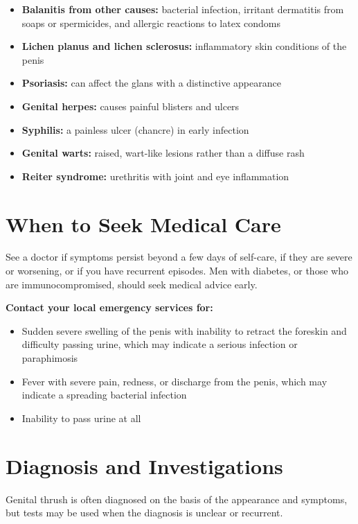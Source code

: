 \begin{itemize}
    \item \textbf{Balanitis from other causes:} bacterial infection, irritant dermatitis from soaps or spermicides, and allergic reactions to latex condoms
    \item \textbf{Lichen planus and lichen sclerosus:} inflammatory skin conditions of the penis
    \item \textbf{Psoriasis:} can affect the glans with a distinctive appearance
    \item \textbf{Genital herpes:} causes painful blisters and ulcers
    \item \textbf{Syphilis:} a painless ulcer (chancre) in early infection
    \item \textbf{Genital warts:} raised, wart-like lesions rather than a diffuse rash
    \item \textbf{Reiter syndrome:} urethritis with joint and eye inflammation
\end{itemize}

\section*{When to Seek Medical Care}
See a doctor if symptoms persist beyond a few days of self-care, if they are severe or worsening, or if you have recurrent episodes. Men with diabetes, or those who are immunocompromised, should seek medical advice early.

\textbf{Contact your local emergency services for:}
\begin{itemize}
    \item Sudden severe swelling of the penis with inability to retract the foreskin and difficulty passing urine, which may indicate a serious infection or paraphimosis
    \item Fever with severe pain, redness, or discharge from the penis, which may indicate a spreading bacterial infection
    \item Inability to pass urine at all
\end{itemize}

\section*{Diagnosis and Investigations}
Genital thrush is often diagnosed on the basis of the appearance and symptoms, but tests may be used when the diagnosis is unclear or recurrent.

